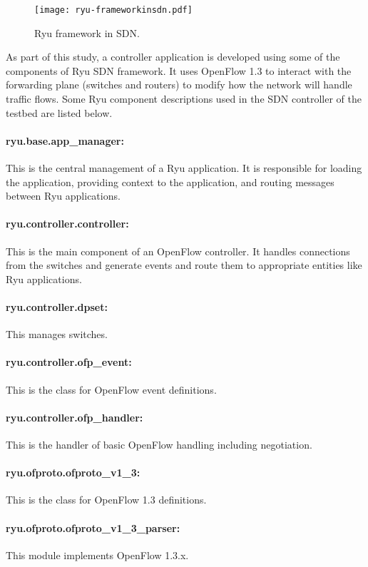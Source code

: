 \begin{figure}[tb]
\begin{center}
	\resizebox{\textwidth}{!}
	{\texttt{[image: ryu-frameworkinsdn.pdf]}}
	\caption{Ryu framework in SDN.}
	\label{fig:ryufwis}
\end{center}
\end{figure}

As part of this study, a controller application is developed using some of the components of Ryu SDN framework. It uses OpenFlow 1.3 to interact with the forwarding plane (switches and routers) to modify how the network will handle traffic flows. Some Ryu component descriptions used in the SDN controller of the testbed are listed below.

\paragraph{ryu.base.app\_manager:}
This is the central management of a Ryu application. It is responsible for loading the application, providing context to the application, and routing messages between Ryu applications.
\paragraph{ryu.controller.controller:}
This is the main component of an OpenFlow controller. It handles connections from the switches and generate events and route them to appropriate entities like Ryu applications.
\paragraph{ryu.controller.dpset:}
This manages switches.
\paragraph{ryu.controller.ofp\_event:}
This is the class for OpenFlow event definitions.
\paragraph{ryu.controller.ofp\_handler:}
This is the handler of basic OpenFlow handling including negotiation.
\paragraph{ryu.ofproto.ofproto\_v1\_3:}
This is the class for OpenFlow 1.3 definitions.
\paragraph{ryu.ofproto.ofproto\_v1\_3\_parser:}
This module implements OpenFlow 1.3.x.
